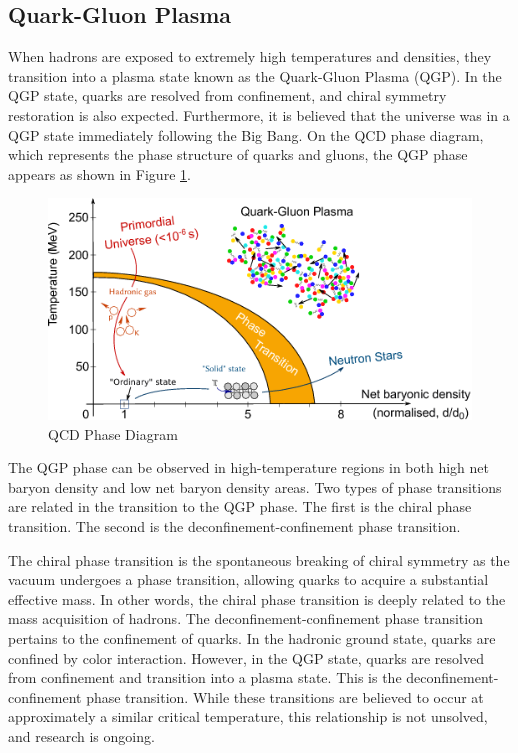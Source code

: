     \subsection{Quark-Gluon Plasma}
        When hadrons are exposed to extremely high temperatures and densities, they transition into a plasma state known as the Quark-Gluon Plasma (QGP). In the QGP state, quarks are resolved from confinement, and chiral symmetry restoration is also expected. Furthermore, it is believed that the universe was in a QGP state immediately following the Big Bang. On the QCD phase diagram, which represents the phase structure of quarks and gluons, the QGP phase appears as shown in Figure \ref{QCD_Phase_Diagram}.    
        \begin{figure}[hbtp]
            \centering
            \includegraphics[keepaspectratio, scale=0.6]{fig/1_4_QCDPhaseDiagram.png}
            \caption{QCD Phase Diagram\cite{QCDPhaseDiagram}}
            \label{QCD_Phase_Diagram}
        \end{figure}
        The QGP phase can be observed in high-temperature regions in both high net baryon density and low net baryon density areas. Two types of phase transitions are related in the transition to the QGP phase. The first is the chiral phase transition. The second is the deconfinement-confinement phase transition.  
        
        The chiral phase transition is the spontaneous breaking of chiral symmetry as the vacuum undergoes a phase transition, allowing quarks to acquire a substantial effective mass. In other words, the chiral phase transition is deeply related to the mass acquisition of hadrons. 
        The deconfinement-\-confinement phase transition pertains to the con\-finement of quarks. 
        In the hadronic ground state, quarks are confined by color interaction.
        However, in the QGP state, quarks are resolved from confinement and transition into a plasma state. 
        This is the deconfinement-\-confinement phase transition. 
        While these transitions are believed to occur at approximately a similar critical temperature, this relationship is not unsolved, and research is ongoing.
        
